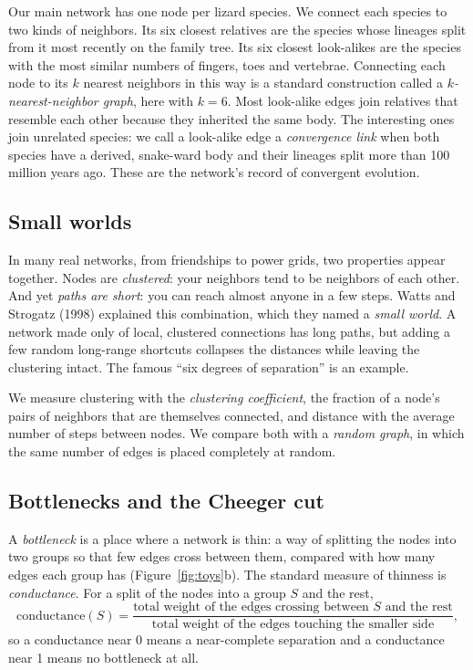 \documentclass[11pt]{article}
\begin{document}
Our main network has one node per lizard species. We connect each species to two kinds of neighbors. Its six closest relatives are the species whose lineages split from it most recently on the family tree. Its six closest look-alikes are the species with the most similar numbers of fingers, toes and vertebrae. Connecting each node to its $k$ nearest neighbors in this way is a standard construction called a \emph{$k$-nearest-neighbor graph}, here with $k = 6$. Most look-alike edges join relatives that resemble each other because they inherited the same body. The interesting ones join unrelated species: we call a look-alike edge a \emph{convergence link} when both species have a derived, snake-ward body and their lineages split more than 100 million years ago. These are the network's record of convergent evolution.

\subsection{Small worlds}

In many real networks, from friendships to power grids, two properties appear together. Nodes are \emph{clustered}: your neighbors tend to be neighbors of each other. And yet \emph{paths are short}: you can reach almost anyone in a few steps. Watts and Strogatz (1998) explained this combination, which they named a \emph{small world}. A network made only of local, clustered connections has long paths, but adding a few random long-range shortcuts collapses the distances while leaving the clustering intact. The famous ``six degrees of separation'' is an example.

We measure clustering with the \emph{clustering coefficient}, the fraction of a node's pairs of neighbors that are themselves connected, and distance with the average number of steps between nodes. We compare both with a \emph{random graph}, in which the same number of edges is placed completely at random.

\subsection{Bottlenecks and the Cheeger cut}

A \emph{bottleneck} is a place where a network is thin: a way of splitting the nodes into two groups so that few edges cross between them, compared with how many edges each group has (Figure~\ref{fig:toys}b). The standard measure of thinness is \emph{conductance}. For a split of the nodes into a group $S$ and the rest,
\[
\text{conductance}(S) = \frac{\text{total weight of the edges crossing between } S \text{ and the rest}}{\text{total weight of the edges touching the smaller side}},
\]
so a conductance near 0 means a near-complete separation and a conductance near 1 means no bottleneck at all.
\end{document}
